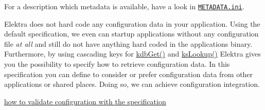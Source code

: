 For a description which metadata is available, have a look in \href{/home/jenkins/workspace/libelektra-release/doc/METADATA.ini}{\tt M\+E\+T\+A\+D\+A\+T\+A.\+ini}.

Elektra does not hard code any configuration data in your application. Using the {\ttfamily default} specification, we even can startup applications without any configuration file {\itshape at all} and still do not have anything hard coded in the applications binary. Furthermore, by using cascading keys for {\ttfamily \hyperlink{group__kdb_ga28e385fd9cb7ccfe0b2f1ed2f62453a1}{kdb\+Get()}} and {\ttfamily \hyperlink{group__keyset_ga60f1ddcf23272f2b29b90e92ebe9b56f}{ks\+Lookup()}} Elektra gives you the possibility to specify how to retrieve configuration data. In this specification you can define to consider or prefer configuration data from other applications or shared places. Doing so, we can achieve configuration integration.


\begin{DoxyItemize}
\item \hyperlink{doc_tutorials_validation_md}{how to validate configuration with the specification} 
\end{DoxyItemize}